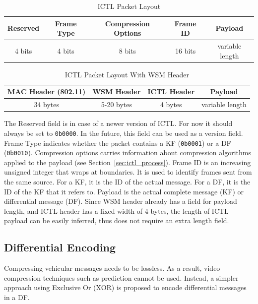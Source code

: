 \documentclass[12pt]{report}
\begin{document}
\begin{table}[h]
  \begin{center}
    \begin{tabular}{|c|c|c|c|c|}
      \hline
      Reserved & Frame Type & Compression Options & Frame ID & Payload \\\hline
      4 bits   &  4 bits    & 8 bits              & 16 bits  & variable length \\\hline
    \end{tabular}
    \caption{\label{tab:ictl_layout}ICTL Packet Layout}
  \end{center}
\end{table}
\begin{table}[h]
  \begin{center}
    \begin{tabular}{|c|c|c|c|}
      \hline
      MAC Header (802.11) & WSM Header & ICTL Header & Payload \\\hline
      34 bytes            & 5-20 bytes & 4 bytes     &  variable length \\\hline
    \end{tabular}
    \caption{\label{tab:ictl_layout_wsm}ICTL Packet Layout With WSM Header}
  \end{center}
\end{table}

The Reserved field is in case of a newer version of ICTL. For now it should always be set to \texttt{0b0000}. In the future, this field can be used as a version field. Frame Type indicates whether the packet contains a KF (\texttt{0b0001}) or a DF (\texttt{0b0010}). Compression options carries information about compression algorithms applied to the payload (see Section~\ref{sec:ictl_process}). Frame ID is an increasing unsigned integer that wraps at boundaries. It is used to identify frames sent from the same source. For a KF, it is the ID of the actual message. For a DF, it is the ID of the KF that it refers to. Payload is the actual complete message (KF) or differential message (DF). Since WSM header already has a field for payload length, and ICTL header has a fixed width of 4 bytes, the length of ICTL payload can be easily inferred, thus does not require an extra length field.

\subsection{Differential Encoding}
\label{sec:ictl_diff}

Compressing vehicular messages needs to be lossless. As a result, video compression techniques such as prediction cannot be used. Instead, a simpler approach using Exclusive Or (XOR) is proposed to encode differential messages in a DF.
\end{document}
